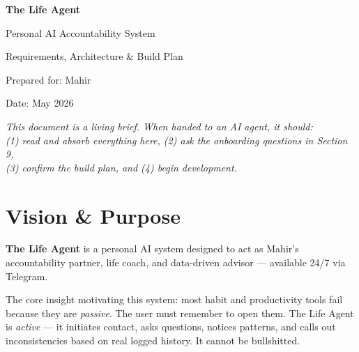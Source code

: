 \documentclass[12pt, a4paper]{article}
\begin{document}
\begin{titlepage}
    \centering
    \vspace*{3cm}
    {\Huge\bfseries The Life Agent\par}
    \vspace{0.5cm}
    {\large\textcolor{midgray}{Personal AI Accountability System}\par}
    \vspace{1.5cm}
    {\normalsize Requirements, Architecture \& Build Plan\par}
    \vspace{0.5cm}
    {\small\textcolor{midgray}{Prepared for: Mahir\par}}
    \vspace{0.3cm}
    {\small\textcolor{midgray}{Date: May 2026\par}}
    \vfill
    \begin{mdframed}[backgroundcolor=lightgray, linecolor=lightgray]
    \centering
    \small\textit{This document is a living brief. When handed to an AI agent, it should:\\
    (1) read and absorb everything here, (2) ask the onboarding questions in Section 9,\\
    (3) confirm the build plan, and (4) begin development.}
    \end{mdframed}
\end{titlepage}

\tableofcontents
\newpage

\section{Vision \& Purpose}

\textbf{The Life Agent} is a personal AI system designed to act as Mahir's accountability partner, life coach, and data-driven advisor --- available 24/7 via Telegram.

The core insight motivating this system: most habit and productivity tools fail because they are \textit{passive}. The user must remember to open them. The Life Agent is \textit{active} --- it initiates contact, asks questions, notices patterns, and calls out inconsistencies based on real logged history. It cannot be bullshitted.
\end{document}
